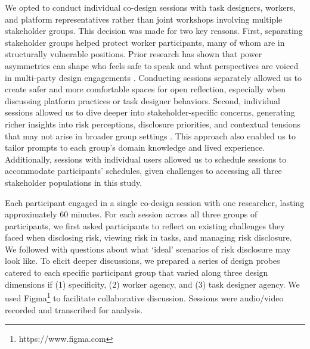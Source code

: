 We opted to conduct individual co-design sessions with task designers, workers, and platform representatives rather than joint workshops involving multiple stakeholder groups. This decision was made for two key reasons. First, separating stakeholder groups helped protect worker participants, many of whom are in structurally vulnerable positions. Prior research has shown that power asymmetries can shape who feels safe to speak and what perspectives are voiced in multi-party design engagements \cite{tang2024ai}. Conducting sessions separately allowed us to create safer and more comfortable spaces for open reflection, especially when discussing platform practices or task designer behaviors. Second, individual sessions allowed us to dive deeper into stakeholder-specific concerns, generating richer insights into risk perceptions, disclosure priorities, and contextual tensions that may not arise in broader group settings \cite{dillahunt2017designing}. This approach also enabled us to tailor prompts to each group’s domain knowledge and lived experience. Additionally, sessions with individual users allowed us to schedule sessions to accommodate participants' schedules, given challenges to accessing all three stakeholder populations in this study. 


Each participant engaged in a single co-design session with one researcher, lasting approximately 60 minutes. For each session across all three groups of participants, we first asked participants to reflect on existing challenges they faced when disclosing risk, viewing risk in tasks, and managing risk disclosure. We followed with questions about what `ideal' scenarios of risk disclosure may look like. To elicit deeper discussions, we prepared a series of design probes catered to each specific participant group that varied along three design dimensions if (1) specificity, (2) worker agency, and (3) task designer agency. We used Figma\footnote{https://www.figma.com} to facilitate collaborative discussion. Sessions were audio/video recorded and transcribed for analysis.

